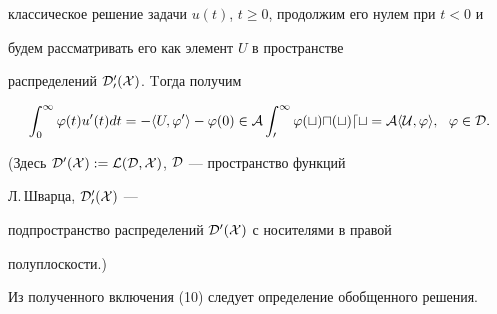 классическое решение задачи $u(t)$, $t\ge0$, продолжим его нулем при $t<0$ и 


будем рассматривать его как элемент $U$ в пространстве 


распределений $\cal D'_0(X)$. Tогда получим 


\begin{equation} 


\int^\infty_0 \varphi(t)u'(t)dt=-\la U,\varphi'\ra-\varphi(0)\in 


\cal A\int^\infty_0 \varphi(t)u(t)dt=\cal A\la U,\varphi\ra, 


\ \ \varphi\in\cal D. 


\end{equation} 


(Здесь $\cal D'(X):=\cal L(\cal D,X)$, $\cal D$ --- пространство функций 


Л.\,Шварца, $\cal D'_0(X)$ --- 


подпространство распределений $\cal D'(X)$ с носителями в правой 


полуплоскости.) 


Из полученного включения (10) следует определение обобщенного решения. 


 


